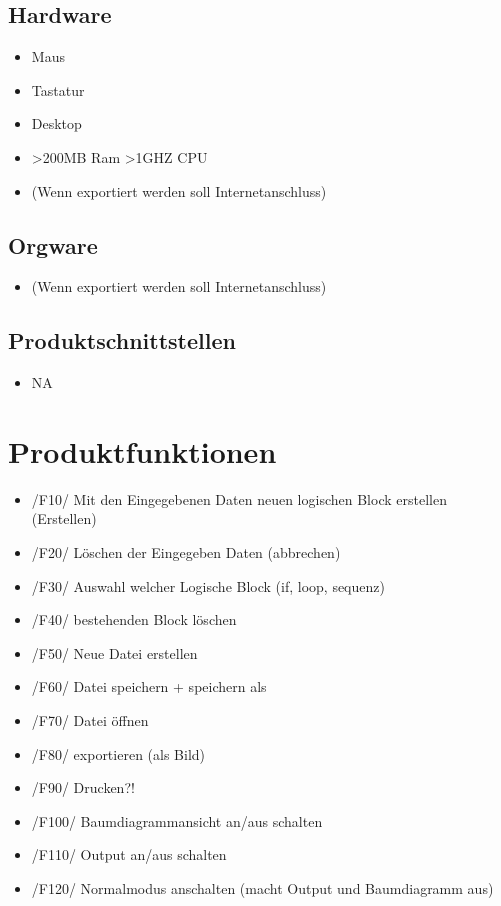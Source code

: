 \documentclass[a4paper,10pt]{report}
\begin{document}
\subsection{Hardware}
\begin{itemize}
\item Maus
\item Tastatur
\item Desktop
\item >200MB Ram >1GHZ CPU
\item (Wenn exportiert werden soll Internetanschluss)
\end{itemize}
\subsection{Orgware}
\begin{itemize}
\item (Wenn exportiert werden soll Internetanschluss)
\end{itemize}
\subsection{Produktschnittstellen}
\begin{itemize}
\item NA
\end{itemize}

\section{Produktfunktionen}
\begin{itemize}
\item /F10/ Mit den Eingegebenen Daten neuen logischen Block erstellen (Erstellen)
\item /F20/ Löschen der Eingegeben Daten (abbrechen)
\item /F30/ Auswahl welcher Logische Block (if, loop, sequenz)
\item /F40/ bestehenden Block löschen
\item /F50/ Neue Datei erstellen
\item /F60/ Datei speichern + speichern als
\item /F70/ Datei öffnen
\item /F80/ exportieren (als Bild)
\item /F90/ Drucken?!
\item /F100/ Baumdiagrammansicht an/aus schalten
\item /F110/ Output an/aus schalten
\item /F120/ Normalmodus anschalten (macht Output und Baumdiagramm aus)
\end{itemize}
\end{document}
